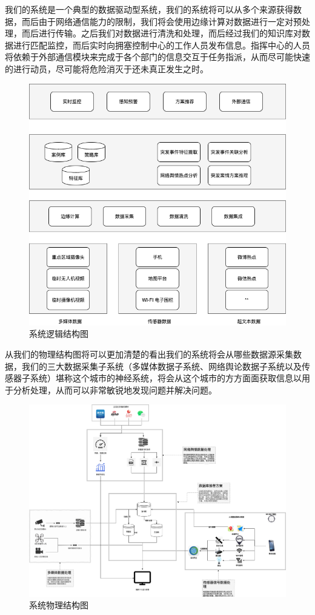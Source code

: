 \documentclass{ctexrep}
\begin{document}
我们的系统是一个典型的数据驱动型系统，我们的系统将可以从多个来源获得数据，而后由于网络通信能力的限制，我们将会使用边缘计算对数据进行一定对预处理，而后进行传输。之后我们对数据进行清洗和处理，而后经过我们的知识库对数据进行匹配监控，而后实时向拥塞控制中心的工作人员发布信息。指挥中心的人员将依赖于外部通信模块来完成于各个部门的信息交互于任务指派，从而尽可能快速的进行动员，尽可能将危险消灭于还未真正发生之时。
\begin{figure}[H]
	\centering
	\includegraphics[scale=0.4]{img/logical.png}
	\caption{系统逻辑结构图}
\end{figure}

从我们的物理结构图将可以更加清楚的看出我们的系统将会从哪些数据源采集数据，我们的三大数据采集子系统（多媒体数据子系统、网络舆论数据子系统以及传感器子系统）堪称这个城市的神经系统，将会从这个城市的方方面面获取信息以用于分析处理，从而可以非常敏锐地发现问题并解决问题。
\begin{figure}[H]
	\centering
	\includegraphics[scale=0.18]{img/physical.png}
	\caption{系统物理结构图}
\end{figure}
\end{document}

